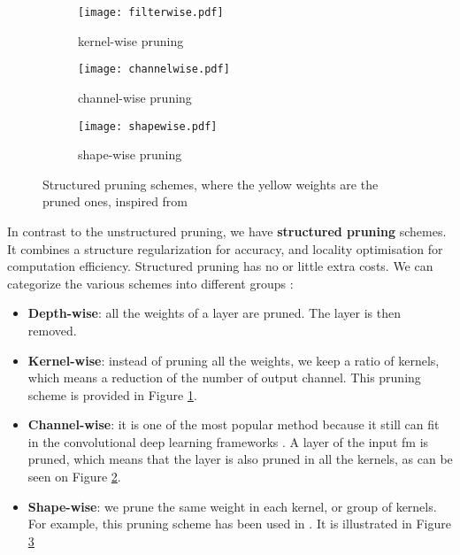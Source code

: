 \begin{figure}
    \centering
    \begin{subfigure}{.32\textwidth}
    \centering
    \texttt{[image: filterwise.pdf]}
    \caption{kernel-wise pruning}
    \label{fig:struct_pruning:fw}
    \end{subfigure}
    \begin{subfigure}{.32\textwidth}
    \centering
    \texttt{[image: channelwise.pdf]}
    \caption{channel-wise pruning}
    \label{fig:struct_pruning:chw}
    \end{subfigure}
    \begin{subfigure}{.32\textwidth}
    \centering
    \texttt{[image: shapewise.pdf]}
    \caption{shape-wise pruning}
    \label{fig:struct_pruning:sw}
    \end{subfigure}
    \caption{Structured pruning schemes, where the yellow weights are the pruned ones, inspired from \cite{cheng_recent_2018}}
    \label{fig:struct_pruning}
\end{figure}
%
In contrast to the unstructured pruning, we have \textbf{structured pruning} schemes. It combines a structure regularization for accuracy, and locality optimisation for computation efficiency. Structured pruning has no or little extra costs. We can categorize the various schemes into different groups \cite{wen_learning_2016, anwar_structured_2017, cheng_recent_2018, kang_accelerator-aware_2020}:
\begin{itemize}
    \item \textbf{Depth-wise}: all the weights of a layer are pruned. The layer is then removed.
    \item \textbf{Kernel-wise}: instead of pruning all the weights, we keep a ratio of kernels, which means a reduction of the number of output channel. This pruning scheme is provided in Figure \ref{fig:struct_pruning:fw}.
    \item \textbf{Channel-wise}: it is one of the most popular method because it still can fit in the convolutional deep learning frameworks \cite{liu_rethinking_2019}. A layer of the input \acrshort{fm} is pruned, which means that the layer is also pruned in all the kernels, as can be seen on Figure \ref{fig:struct_pruning:chw}.
    \item \textbf{Shape-wise}: we prune the same weight in each kernel, or group of kernels. For example, this pruning scheme has been used in \textcite{zhu_efficient_2020}. It is illustrated in Figure \ref{fig:struct_pruning:sw}
\end{itemize}

